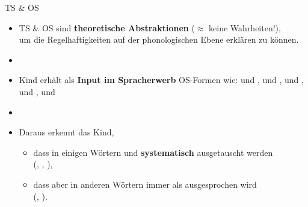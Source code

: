 \begin{frame}{TS \& OS}

\begin{itemize}
	\item TS \& OS sind \textbf{theoretische Abstraktionen} ($\approx$ keine Wahrheiten!),\\
              um die Regelhaftigkeiten auf der phonologischen Ebene erklären zu können.
	\item[]
	\item Kind erhält als \textbf{Input im Spracherwerb} OS-Formen wie: \textipa{[\textscr\ a: t]} und \textipa{[\textscr~E:~t~@]}, \textipa{[\textscr\ a: t]} und \textipa{[\textscr\ E: d 5]}, \textipa{[b E t]} und \textipa{[b E t @ n]}, \textipa{[b a: t]} und \textipa{[b~E:~d~5]}, \textipa{[k I n t]} und \textipa{[k I n d 5]}
	\item[]
	\item Daraus erkennt das Kind,

	\begin{itemize}
		\item dass in einigen Wörtern \textipa{[d]} und \textipa{[t]} \textbf{systematisch} ausgetauscht werden \\ (\zB {}, , ),
		\item dass aber in anderen Wörtern \textipa{[t]} immer als \textipa{[t]} ausgesprochen wird  \\ (\zB {}, ).
	\end{itemize}
		
\end{itemize}

\end{frame}



